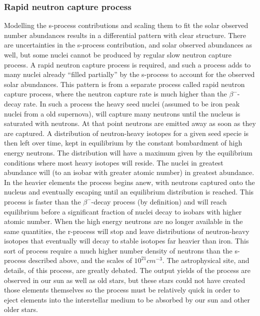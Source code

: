 \subsubsection{Rapid neutron capture process} \label{sec:rncp}
Modelling the s-process contributions and scaling them to fit the solar observed number abundances results in a differential pattern with clear structure.
There are uncertainties in the s-process contribution, and solar observed abundances as well, but some nuclei cannot be produced by regular slow neutron capture process.
A rapid neutron capture process is required, and such a process adds to many nuclei already ``filled partially'' by the s-process to account for the observed solar abundances.
This pattern is from a separate process called rapid neutron capture process, where the neutron capture rate is much higher than the $\beta^-$-decay rate. In such a process the heavy seed nuclei (assumed to be iron peak nuclei from a old supernova), will capture many neutrons until the nucleus is saturated with neutrons.
At that point neutrons are emitted away as soon as they are captured.
A distribution of neutron-heavy isotopes for a given seed specie is then left over time, kept in equilibrium by the constant bombardment of high energy neutrons.
The distribution will have a maximum given by the equilibrium conditions where most heavy isotopes will reside.
The nuclei in greatest abundance will \betadecay (to an isobar with greater atomic number) in greatest abundance.
In the heavier elements the process begins anew, with neutrons captured onto the nucleus and eventually escaping until an equilibrium distribution is reached. This process is faster than the $\beta^-$-decay process (by definition) and will reach equilibrium before a significant fraction of nuclei decay to isobars with higher atomic number.
When the high energy neutrons are no longer available in the same quantities, the r-process will stop and leave distributions of neutron-heavy isotopes that eventually will decay to stable isotopes far heavier than iron.
This sort of process require a much higher number density of neutrons than the s-process described above, and the scales of $10^{21} cm^{-3}$.
The astrophysical site, and details, of this process, are greatly debated.
The output yields of the process are observed in our sun as well as old stars, but these stars could not have created those elements themselves so the process must be relatively quick in order to eject elements into the interstellar medium to be absorbed by our sun and other older stars.

